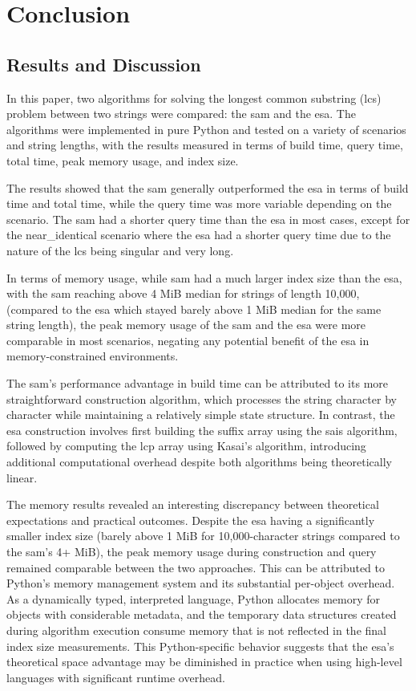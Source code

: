 \chapter{Conclusion}

\section{Results and Discussion}

In this paper, two algorithms for solving the longest common substring (\acrshort{lcs}) problem between two strings were compared: the \acrfull{sam} and the \acrfull{esa}.
The algorithms were implemented in pure Python and tested on a variety of scenarios and string lengths, with the results measured in terms of build time, query time, total time, peak memory usage, and index size.

The results showed that the \acrshort{sam} generally outperformed the \acrshort{esa} in terms of build time and total time, while the query time was more variable depending on the scenario.
The \acrshort{sam} had a shorter query time than the \acrshort{esa} in most cases, except for the near\_identical scenario where the \acrshort{esa} had a shorter query time due to the nature of the \acrshort{lcs} being singular and very long.

In terms of memory usage, while \acrshort{sam} had a much larger index size than the \acrshort{esa}, with the \acrshort{sam}
reaching above 4 MiB median for strings of length 10,000, (compared to the \acrshort{esa} which stayed barely above 1 MiB median for the same string length),
the peak memory usage of the \acrshort{sam} and the \acrshort{esa} were more comparable in most scenarios, negating any potential benefit of the \acrshort{esa} in memory-constrained environments.

The \acrshort{sam}'s performance advantage in build time can be attributed to its more straightforward construction algorithm, which processes the string character by character while maintaining a relatively simple state structure.
In contrast, the \acrshort{esa} construction involves first building the suffix array using the \acrshort{sais} algorithm, followed by computing the \acrshort{lcp} array using Kasai's algorithm, introducing additional computational overhead despite both algorithms being theoretically linear.

The memory results revealed an interesting discrepancy between theoretical expectations and practical outcomes.
Despite the \acrshort{esa} having a significantly smaller index size (barely above 1 MiB for 10,000-character strings compared to the \acrshort{sam}'s 4+ MiB), the peak memory usage during construction and query remained comparable between the two approaches.
This can be attributed to Python's memory management system and its substantial per-object overhead.
As a dynamically typed, interpreted language, Python allocates memory for objects with considerable metadata, and the temporary data structures created during algorithm execution consume memory that is not reflected in the final index size measurements.
This Python-specific behavior suggests that the \acrshort{esa}'s theoretical space advantage may be diminished in practice when using high-level languages with significant runtime overhead.

